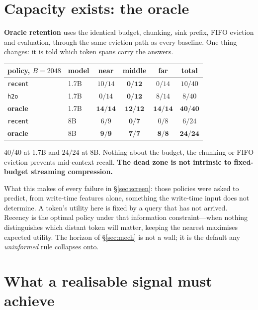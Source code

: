 \documentclass[10pt]{article}
\begin{document}
\section{Capacity exists: the oracle}\label{sec:oracle}

\textbf{Oracle retention} uses the identical budget, chunking, sink prefix,
FIFO eviction and evaluation, through the same eviction path as every baseline.
One thing changes: it is told which token spans carry the answers.

\begin{table}[h]\centering\small
\begin{tabular}{llcccc}
\toprule
policy, $B{=}2048$ & model & near & middle & far & total \\
\midrule
\texttt{recent}  & 1.7B & $10/14$ & $\mathbf{0/12}$ & $0/14$ & $10/40$ \\
\texttt{h2o}     & 1.7B & $0/14$ & $\mathbf{0/12}$ & $8/14$ & $8/40$ \\
\textbf{oracle}  & 1.7B & $\mathbf{14/14}$ & $\mathbf{12/12}$ & $\mathbf{14/14}$ & $\mathbf{40/40}$ \\
\midrule
\texttt{recent}  & 8B & $6/9$ & $\mathbf{0/7}$ & $0/8$ & $6/24$ \\
\textbf{oracle}  & 8B & $\mathbf{9/9}$ & $\mathbf{7/7}$ & $\mathbf{8/8}$ & $\mathbf{24/24}$ \\
\bottomrule
\end{tabular}
\end{table}

$40/40$ at 1.7B and $24/24$ at 8B. Nothing about the budget, the chunking or
FIFO eviction prevents mid-context recall. \textbf{The dead zone is not
intrinsic to fixed-budget streaming compression.}

What this makes of every failure in \S\ref{sec:screen}: those policies were
asked to predict, from write-time features alone, something the write-time
input does not determine. A token's utility here is fixed by a query that has
not arrived. Recency is the optimal policy under that information
constraint---when nothing distinguishes which distant token will matter,
keeping the nearest maximises expected utility. The horizon of
\S\ref{sec:mech} is not a wall; it is the default any \emph{uninformed} rule
collapses onto.

\section{What a realisable signal must achieve}\label{sec:spec}
\end{document}
